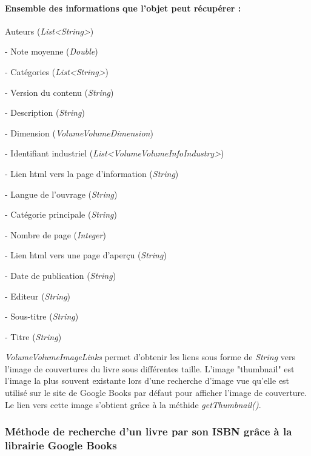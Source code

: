 \paragraph{Ensemble des informations que l'objet peut récupérer :}
\begin{description}
\item
Auteurs (\emph{List\textless String\textgreater})
\item
- Note moyenne (\emph{Double})
\item
- Catégories (\emph{List\textless String\textgreater})
\item
- Version du contenu (\emph{String})
\item
- Description (\emph{String})
\item
- Dimension (\emph{VolumeVolumeDimension})
\item
- Identifiant industriel (\emph{List\textless VolumeVolumeInfoIndustry\textgreater})
\item
- Lien html vers la page d'information (\emph{String})
\item
- Langue de l'ouvrage (\emph{String})
\item
- Catégorie principale (\emph{String})
\item
- Nombre de page (\emph{Integer})
\item
- Lien html vers une page d'aperçu (\emph{String})
\item
- Date de publication (\emph{String})
\item
- Editeur (\emph{String})
\item
- Sous-titre (\emph{String})
\item
- Titre (\emph{String})
\end{description}

\emph{VolumeVolumeImageLinks} permet d'obtenir les liens sous forme de \emph{String} vers l'image de couvertures du livre sous différentes taille. L'image "thumbnail" est l'image la plus souvent existante lors d'une recherche d'image vue qu'elle est utilisé sur le site de Google Books par défaut pour afficher l'image de couverture. Le lien vers cette image s'obtient grâce à la méthide \emph{getThumbnail()}.

\subsubsection{Méthode de recherche d'un livre par son ISBN grâce à la librairie Google Books}

